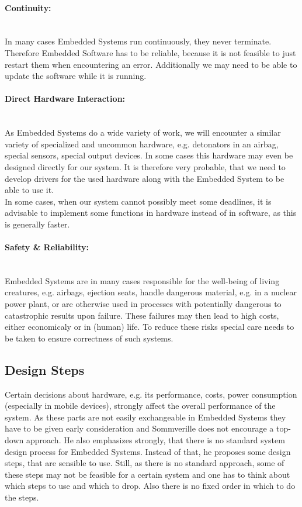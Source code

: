 \documentclass[10pt,a4paper,titlepage,draft]{article} %
\begin{document}
\paragraph{Continuity:} \ \\
In many cases Embedded Systems run continuously, they never terminate.
Therefore Embedded Software has to be reliable, because it is not feasible to just restart them when encountering an error.
Additionally we may need to be able to update the software while it is running.

\paragraph{Direct Hardware Interaction:} \ \\
As Embedded Systems do a wide variety of work, we will encounter a similar variety of specialized and uncommon hardware, e.g. detonators in an airbag, special sensors, special output devices.
In some cases this hardware may even be designed directly for our system.
It is therefore very probable, that we need to develop drivers for the used hardware along with the Embedded System to be able to use it.
\\
In some cases, when our system cannot possibly meet some deadlines, it is advisable to implement some functions in hardware instead of in software, as this is generally faster.

\paragraph{Safety \& Reliability:} \ \\
Embedded Systems are in many cases responsible for the well-being of living creatures, e.g. airbags, ejection seats, handle dangerous material, e.g. in a nuclear power plant, or are otherwise used in processes with potentially dangerous to catastrophic results upon failure.
These failures may then lead to high costs, either economicaly or in (human) life.
To reduce these risks special care needs to be taken to ensure correctness of such systems.

\subsection{Design Steps}
Certain decisions about hardware, e.g. its performance, costs, power consumption (especially in mobile devices), strongly affect the overall performance of the system.
As these parts are not easily exchangeable in Embedded Systems they have to be given early consideration and Sommverille does not encourage a top-down approach\cite[p. 540]{sommerville}.
He also emphasizes strongly, that there is no standard system design process for Embedded Systems.
Instead of that, he proposes some design steps, that are sensible to use.
Still, as there is no standard approach, some of these steps may not be feasible for a certain system and one has to think about which steps to use and which to drop.
Also there is no fixed order in which to do the steps.
\end{document}
